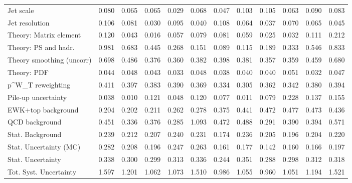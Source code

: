 \begin{tabular}{l|p{0.6cm}p{0.6cm}p{0.6cm}p{0.6cm}p{0.6cm}p{0.6cm}p{0.6cm}p{0.6cm}p{0.6cm}p{0.6cm}p{0.6cm}}
Jet scale                                & 0.080 & 0.065 & 0.065 & 0.029 & 0.068 & 0.047 & 0.103 & 0.105 & 0.063 & 0.090 & 0.083 \\
Jet resolution                           & 0.106 & 0.081 & 0.030 & 0.095 & 0.040 & 0.108 & 0.064 & 0.037 & 0.070 & 0.065 & 0.045 \\
Theory: Matrix element                   & 0.120 & 0.043 & 0.016 & 0.057 & 0.079 & 0.081 & 0.059 & 0.025 & 0.032 & 0.111 & 0.212 \\
Theory: PS and hadr.                     & 0.981 & 0.683 & 0.445 & 0.268 & 0.151 & 0.089 & 0.115 & 0.189 & 0.333 & 0.546 & 0.833 \\
Theory smoothing (uncorr)                & 0.698 & 0.486 & 0.376 & 0.360 & 0.382 & 0.398 & 0.381 & 0.357 & 0.359 & 0.459 & 0.680 \\
Theory: PDF                              & 0.044 & 0.048 & 0.043 & 0.033 & 0.048 & 0.038 & 0.040 & 0.040 & 0.051 & 0.032 & 0.047 \\
p^{W}_{T} reweighting                    & 0.411 & 0.397 & 0.383 & 0.390 & 0.369 & 0.334 & 0.305 & 0.362 & 0.342 & 0.380 & 0.394 \\
Pile-up uncertainty                      & 0.038 & 0.010 & 0.121 & 0.048 & 0.120 & 0.077 & 0.011 & 0.079 & 0.228 & 0.137 & 0.155 \\
EWK+top background                       & 0.204 & 0.202 & 0.211 & 0.262 & 0.278 & 0.375 & 0.441 & 0.472 & 0.477 & 0.473 & 0.436 \\
QCD background                           & 0.451 & 0.336 & 0.376 & 0.285 & 1.093 & 0.472 & 0.488 & 0.291 & 0.390 & 0.394 & 0.571 \\
Stat. Background                         & 0.239 & 0.212 & 0.207 & 0.240 & 0.231 & 0.174 & 0.236 & 0.205 & 0.196 & 0.204 & 0.220 \\
Stat. Uncertainty (MC)                   & 0.282 & 0.208 & 0.196 & 0.247 & 0.263 & 0.161 & 0.177 & 0.142 & 0.160 & 0.166 & 0.197 \\
\hline
Stat. Uncertainty                        & 0.338 & 0.300 & 0.299 & 0.313 & 0.336 & 0.244 & 0.351 & 0.288 & 0.298 & 0.312 & 0.318 \\
\hline
Tot. Syst. Uncertainty                   & 1.597 & 1.201 & 1.062 & 1.073 & 1.510 & 0.986 & 1.055 & 0.960 & 1.051 & 1.194 & 1.521 \\
\hline
\end{tabular}
